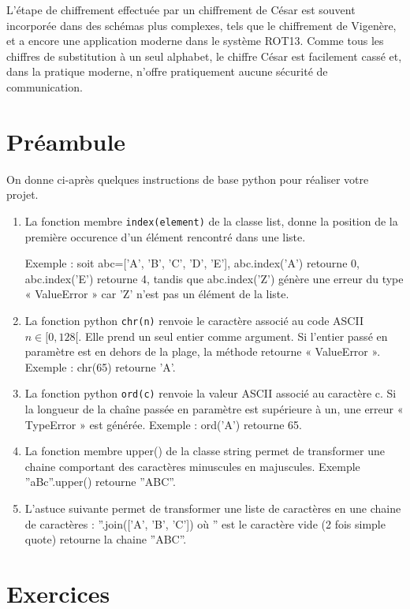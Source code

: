 \documentclass[a4paper, 12pt]{article}
\begin{document}
L'étape de chiffrement effectuée par un chiffrement de César est souvent incorporée dans des schémas plus complexes, tels que le chiffrement de Vigenère, et a encore une application moderne dans le système ROT13. Comme tous les chiffres de substitution à un seul alphabet, le chiffre César est facilement cassé et, dans la pratique moderne, n'offre pratiquement aucune sécurité de communication. 

\section{Préambule}

On donne ci-après quelques instructions de base python pour réaliser votre projet.

\begin{enumerate} 
\item La fonction membre {\tt index(element)} de la classe list, donne la position de la première occurence d'un élément rencontré dans une liste.

Exemple : soit  abc=['A', 'B', 'C', 'D', 'E'],  abc.index('A') retourne 0,  abc.index('E') retourne 4, tandis que abc.index('Z') génère
une erreur du type  « ValueError » car 'Z' n'est pas un élément de la liste.

\item La fonction python {\tt chr(n)} renvoie le caractère associé au code ASCII $n \in [0, 128[$. Elle prend un seul entier comme argument.
 Si l’entier passé en paramètre est en dehors de la plage, la méthode retourne « ValueError ».
 Exemple : chr(65) retourne 'A'.

\item La fonction python {\tt ord(c)} renvoie la valeur ASCII associé au caractère c. Si la longueur de la chaîne passée en paramètre est supérieure à un, une erreur « TypeError » est générée. Exemple : ord('A') retourne 65.

\item La fonction membre upper() de la classe string permet de transformer une chaine comportant des caractères minuscules en majuscules.
Exemple ''aBc''.upper() retourne ''ABC''.

\item L'astuce suivante permet de  transformer une liste de caractères en une chaine de caractères : ''.join(['A', 'B', 'C']) où '' est le caractère vide (2 fois simple quote) retourne la chaine ''ABC''.  
\end{enumerate}

\section{Exercices}
\end{document}
